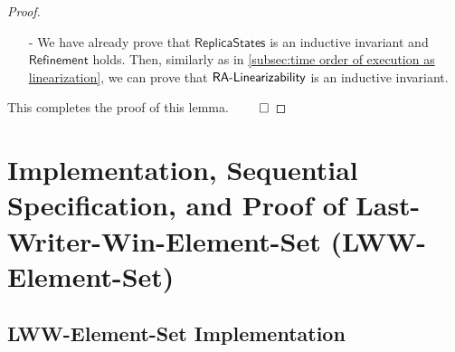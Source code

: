 \begin {proof}
\begin{itemize}
\begin{itemize}
    Since $\alinord$ is consistent with the visibility relation, for each operation $\alabel'$, such that $(\alabel',\alabel) \in \avisord$, we can see that, $\alabel' \in \{ \alabel''_1,\ldots,\alabel''_m \}$. Given a replica state $S_1$ and an effector $(A_b,R_b)$ that is generated by a $\alabelshort[\mathtt{add}]{b}$ operation, assume that we obtain replica state $S_2$ from $S_1$ by applying the effector $(A_b,R_b)$ and $S_2 = (A_r,R_2)$. By Annotation1 of $(A_b,R_b)$, we can see that $b \in A_b$, and by the implementation, it is easy to see that, $b \in A_2$. Similar case holds for {\tt remove}. Therefore, by Annotation1 of $(A_a,R_a)$, we can see that, $A_a \setminus \{ a \} \subseteq A$ and $R_a \subseteq R$, and thus, we can see that $A' = A \cup \{ a \}$ and $R' = R$. Therefore, we have that $S' = \abstate'$.

    \item[-] The cases of {\tt remove} can be similarly proved.

    \item[-] Applying the query $\alabelshort[read]{}$ on the replica state $S$ should result in the same return value as applying the same query in the context of the specification on the same state $\abstate = \refmap(S)$, which again holds trivially.
    \end{itemize}

\item[-] We have already prove that $\mathsf{ReplicaStates}$ is an inductive invariant and $\mathsf{Refinement}$ holds. Then, similarly as in \sectionautorefname \ref{subsec:time order of execution as linearization}, we can prove that $\mathsf{RA\text{-}Linearizability{}}$ is an inductive invariant.
\end{itemize}

This completes the proof of this lemma. $\qed$
\end {proof}






\section{Implementation, Sequential Specification, and Proof of Last-Writer-Win-Element-Set (LWW-Element-Set)}
\label{sec:implementation, sequential specification, and proof of last-writer-win-element-set (LWW-element-set)}


\subsection{LWW-Element-Set Implementation}
\label{subsec:LWW-element-set implementation}

